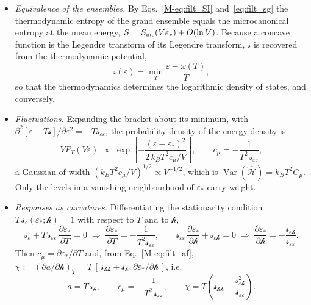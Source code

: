 \documentclass[10pt,a4paper]{article}
\theoremstyle{plain}
\theoremstyle{remark}
\newcommand{\Var}{\operatorname{Var}}
\newcommand{\hfield}{\mathscr{h}}  %
\newcommand{\lds}{\mathscr{s}}  %
\begin{document}
\begin{itemize}
\item \emph{Equivalence of the ensembles.} By Eqs.~\eqref{M-eq:filt_SI}
  and~\eqref{eq:filt_sg} the thermodynamic entropy of the grand ensemble
  equals the microcanonical entropy at the mean energy,
  $S=S_{\rm mc}(V\varepsilon_*)+O(\ln V)$. Because a concave function is
  the Legendre transform of its Legendre transform, $\lds$ is recovered from
  the thermodynamic potential,
  \begin{equation}\label{eq:filt_legendre_inv}
    \lds(\varepsilon)=\min_T\frac{\varepsilon-\omega(T)}{T} ,
  \end{equation}
  so that the thermodynamics determines the logarithmic density of states,
  and conversely.
\item \emph{Fluctuations.} Expanding the bracket about its minimum, with
  $ \partial^{2}[\varepsilon - T\lds]/\partial\varepsilon^{2} = -T\lds_{\varepsilon\varepsilon} $,
  the probability density of the energy density is
  \begin{equation}\label{eq:filt_gauss}
    V P_T(V\varepsilon)\;\propto\;
    \exp\left[-\frac{(\varepsilon - \varepsilon_*)^{2}}{2\,k_BT^{2}c_\mu/V}\right] ,
    \qquad
    c_\mu = -\frac{1}{T^{2}\,\lds_{\varepsilon\varepsilon}} ,
  \end{equation}
  a Gaussian of width $ (k_BT^{2}c_\mu/V)^{1/2} \propto V^{-1/2} $, which is
  $ \Var(\hat{\mathcal{H}}) = k_BT^{2}C_\mu $. Only the levels in a vanishing
  neighbourhood of $ \varepsilon_* $ carry weight.
\item \emph{Responses as curvatures.} Differentiating the stationarity
  condition $ T\,\lds_\varepsilon(\varepsilon_*;\hfield) = 1 $ with respect to $ T $
  and to $ \hfield $,
  \[
    \lds_\varepsilon + T\,\lds_{\varepsilon\varepsilon}\,\frac{\partial\varepsilon_*}{\partial T} = 0
    \;\Longrightarrow\;
    \frac{\partial\varepsilon_*}{\partial T} = -\frac{1}{T^{2}\lds_{\varepsilon\varepsilon}} ,
    \qquad
    \lds_{\varepsilon\varepsilon}\,\frac{\partial\varepsilon_*}{\partial \hfield} + \lds_{\varepsilon \hfield} = 0
    \;\Longrightarrow\;
    \frac{\partial\varepsilon_*}{\partial \hfield} = -\frac{\lds_{\varepsilon \hfield}}{\lds_{\varepsilon\varepsilon}} .
  \]
  Then $ c_\mu = \partial\varepsilon_*/\partial T $ and, from
  Eq.~\eqref{M-eq:filt_af},
  $ \chi := (\partial a/\partial \hfield)_T
  = T\,[\,\lds_{\hfield\hfield} + \lds_{\hfield\varepsilon}\,\partial\varepsilon_*/\partial \hfield\,] $, i.e.
  \begin{equation}\label{eq:filt_curv}
    a = T\,\lds_\hfield , \qquad
    c_\mu = -\frac{1}{T^{2}\,\lds_{\varepsilon\varepsilon}} , \qquad
    \chi = T\left(\lds_{\hfield\hfield} - \frac{\lds_{\varepsilon \hfield}^{2}}{\lds_{\varepsilon\varepsilon}}\right) .
  \end{equation}
\end{itemize}
\end{document}
